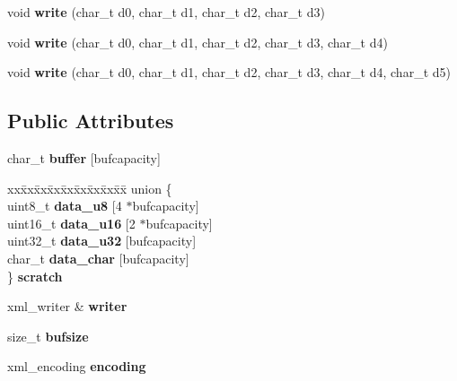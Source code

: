 \begin{DoxyCompactItemize}
\item 
\mbox{\label{classxml__buffered__writer_af679f459dfa0af257c190b8db57e7dcb}} 
void {\bfseries write} (char\+\_\+t d0, char\+\_\+t d1, char\+\_\+t d2, char\+\_\+t d3)
\item 
\mbox{\label{classxml__buffered__writer_aad4a4f18223ec3cb1ff607425119b85f}} 
void {\bfseries write} (char\+\_\+t d0, char\+\_\+t d1, char\+\_\+t d2, char\+\_\+t d3, char\+\_\+t d4)
\item 
\mbox{\label{classxml__buffered__writer_ae6af5067d768c24b9c20422f76737f29}} 
void {\bfseries write} (char\+\_\+t d0, char\+\_\+t d1, char\+\_\+t d2, char\+\_\+t d3, char\+\_\+t d4, char\+\_\+t d5)
\end{DoxyCompactItemize}
\subsection*{Public Attributes}
\begin{DoxyCompactItemize}
\item 
\mbox{\label{classxml__buffered__writer_a84c87765fbdf444d981ffb0f67899dd4}} 
char\+\_\+t {\bfseries buffer} \mbox{[}bufcapacity\mbox{]}
\item 
\mbox{\label{classxml__buffered__writer_a74fd3d695095835afa0f7671ac33037c}} 
\begin{tabbing}
xx\=xx\=xx\=xx\=xx\=xx\=xx\=xx\=xx\=\kill
union \{\\
\>uint8\_t {\bfseries data\_u8} \mbox{[}4 $\ast$bufcapacity\mbox{]}\\
\>uint16\_t {\bfseries data\_u16} \mbox{[}2 $\ast$bufcapacity\mbox{]}\\
\>uint32\_t {\bfseries data\_u32} \mbox{[}bufcapacity\mbox{]}\\
\>char\_t {\bfseries data\_char} \mbox{[}bufcapacity\mbox{]}\\
\} {\bfseries scratch}\\

\end{tabbing}\item 
\mbox{\label{classxml__buffered__writer_a37cdd45f867937e1978565f5a0fa318b}} 
xml\+\_\+writer \& {\bfseries writer}
\item 
\mbox{\label{classxml__buffered__writer_a6bad6a93035d796939d84bee30e74ce7}} 
size\+\_\+t {\bfseries bufsize}
\item 
\mbox{\label{classxml__buffered__writer_ab810a7286598172e1549561b285f08fb}} 
xml\+\_\+encoding {\bfseries encoding}
\end{DoxyCompactItemize}
